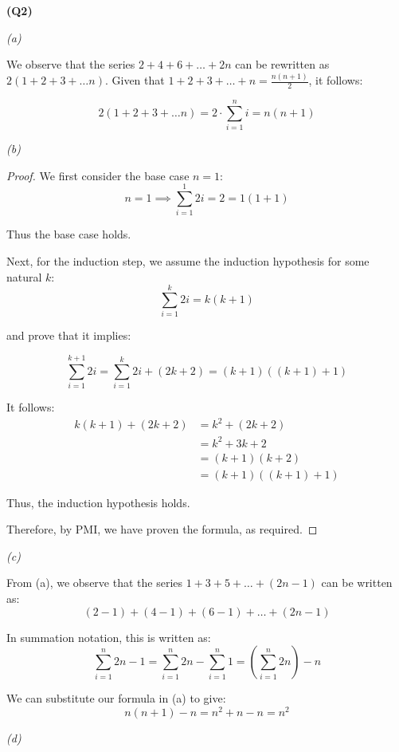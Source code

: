 \documentclass[12pt, a4paper]{article}
\begin{document}
\noindent\textbf{(Q2)}

\noindent\textit{(a)}

We observe that the series $2 + 4 + 6 + \ldots + 2n$ can be rewritten as
$2(1 + 2 + 3 + \ldots n)$. Given that $1 + 2 + 3 + \ldots + n = \frac{n(n + 1)}{2}$,
it follows:

\[
    2(1 + 2 + 3 + \ldots n) = 2 \cdot \sum_{i = 1}^{n} i = n(n + 1)
\]

\noindent\textit{(b)}

\begin{proof}
    We first consider the base case $n = 1$:
    \[
        n = 1 \implies \sum_{i = 1}^{1} 2i = 2 = 1(1 + 1)
    \]

    Thus the base case holds.

    Next, for the induction step, we assume the induction hypothesis for some natural $k$:
    \[
        \sum_{i = 1}^{k} 2i = k(k + 1)
    \]

    and prove that it implies:
    
    \[
        \sum_{i = 1}^{k + 1} 2i = \sum_{i = 1}^{k} 2i + (2k + 2) = (k + 1)((k + 1) + 1)
    \]

    It follows:
    \begin{align*}
        k(k + 1) + (2k + 2) & = k^2 + (2k + 2)\\
        & = k^2 + 3k + 2\\
        & = (k + 1)(k + 2)\\
        & = (k + 1)((k + 1) + 1)
    \end{align*}

    Thus, the induction hypothesis holds.

    Therefore, by PMI, we have proven the formula, as required.
\end{proof}

\newpage

\noindent\textit{(c)}

From (a), we observe that the series $1 + 3 + 5 + \ldots + (2n - 1)$ can be written as:
\[
    (2 - 1) + (4 - 1) + (6 - 1) + \ldots + (2n - 1)
\]

In summation notation, this is written as:
\[
    \sum_{i = 1}^{n} 2n - 1 = \sum_{i = 1}^{n} 2n - \sum_{i = 1}^{n} 1 = \left(\sum_{i = 1}^{n} 2n\right) - n
\]

We can substitute our formula in (a) to give:
\[
    n(n + 1) - n = n^2 + n - n = n^2
\]

\noindent\textit{(d)}
\end{document}
